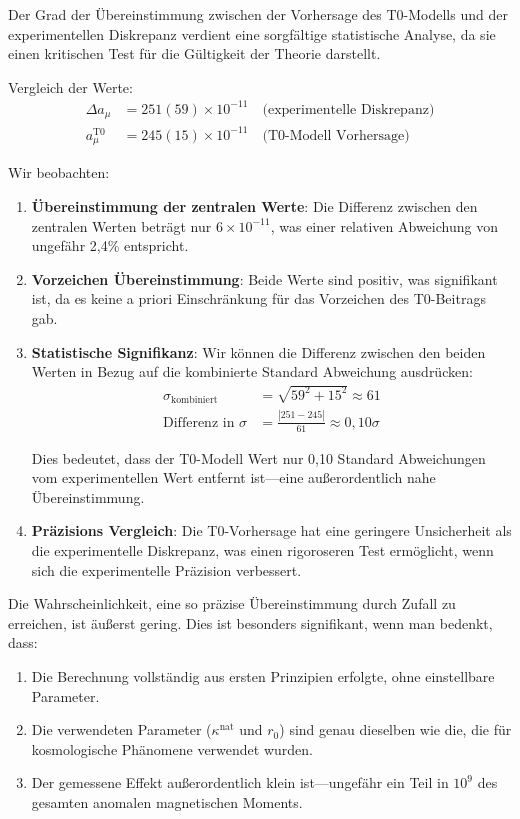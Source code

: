 \documentclass[12pt,a4paper]{article}
\begin{document}
	Der Grad der Übereinstimmung zwischen der Vorhersage des T0-Modells und der experimentellen Diskrepanz verdient eine sorgfältige statistische Analyse, da sie einen kritischen Test für die Gültigkeit der Theorie darstellt.
	
	Vergleich der Werte:
	\begin{align}
		\Delta a_\mu &= 251(59) \times 10^{-11} \quad \text{(experimentelle Diskrepanz)} \\
		a_\mu^{\text{T0}} &= 245(15) \times 10^{-11} \quad \text{(T0-Modell Vorhersage)}
	\end{align}
	
	Wir beobachten:
	
	\begin{enumerate}
		\item \textbf{Übereinstimmung der zentralen Werte}: Die Differenz zwischen den zentralen Werten beträgt nur $6 \times 10^{-11}$, was einer relativen Abweichung von ungefähr 2,4\% entspricht.
		
		\item \textbf{Vorzeichen Übereinstimmung}: Beide Werte sind positiv, was signifikant ist, da es keine a priori Einschränkung für das Vorzeichen des T0-Beitrags gab.
		
		\item \textbf{Statistische Signifikanz}: Wir können die Differenz zwischen den beiden Werten in Bezug auf die kombinierte Standard Abweichung ausdrücken:
		\begin{align}
			\sigma_{\text{kombiniert}} &= \sqrt{59^2 + 15^2} \approx 61 \\
			\text{Differenz in } \sigma &= \frac{|251 - 245|}{61} \approx 0,10\sigma
		\end{align}
		
		Dies bedeutet, dass der T0-Modell Wert nur 0,10 Standard Abweichungen vom experimentellen Wert entfernt ist—eine außerordentlich nahe Übereinstimmung.
		
		\item \textbf{Präzisions Vergleich}: Die T0-Vorhersage hat eine geringere Unsicherheit als die experimentelle Diskrepanz, was einen rigoroseren Test ermöglicht, wenn sich die experimentelle Präzision verbessert.
	\end{enumerate}
	
	Die Wahrscheinlichkeit, eine so präzise Übereinstimmung durch Zufall zu erreichen, ist äußerst gering. Dies ist besonders signifikant, wenn man bedenkt, dass:
	
	\begin{enumerate}
		\item Die Berechnung vollständig aus ersten Prinzipien erfolgte, ohne einstellbare Parameter.
		
		\item Die verwendeten Parameter ($\kappa^{\text{nat}}$ und $r_0$) sind genau dieselben wie die, die für kosmologische Phänomene verwendet wurden.
		
		\item Der gemessene Effekt außerordentlich klein ist—ungefähr ein Teil in $10^{9}$ des gesamten anomalen magnetischen Moments.
	\end{enumerate}
	
\end{document}
